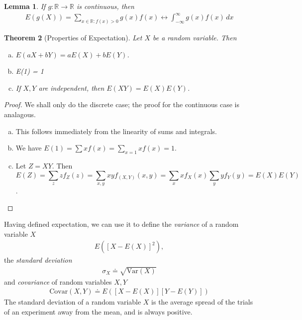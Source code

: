 \documentclass[12pt]{article}
\newcommand{\rr}{\mathbb{R}}
\newcommand{\var}{\text{Var}}
\newcommand{\covar}{\text{Covar}}
\theoremstyle{plain}
\newtheorem{theorem}{Theorem}
\newtheorem{lemma}[theorem]{Lemma}
\theoremstyle{definition}
\theoremstyle{remark}
\numberwithin{equation}{section}  %
\begin{document}
\begin{lemma}
If $g: \rr \to \rr$ is continuous, then
\begin{align*}
E(g(X)) = \sum_{x \in \rr: f(x) > 0} g(x) f(x) \longleftrightarrow
\int_{-\infty}^{\infty} g(x) f(x) \, dx
\end{align*}
\end{lemma}
\begin{theorem}[Properties of Expectation]
Let $X$ be a random variable. Then
\begin{enumerate}[a)]
	\item $E(aX + bY) = aE(X) + bE(Y)$.
	\item E(1) = 1
	\item If $X,Y$ are independent, then $E(XY) = E(X)E(Y)$.
\end{enumerate}
\end{theorem}
\begin{proof}
We shall only do the discrete case; the proof for the continuous case is
analagous.
\begin{enumerate}[a)]
\item This follows immediately from the linearity of sums and integrals.
\item
We have $E(1) = \sum x f(x) = \sum_{x = 1} x f(x) = 1.$
\item
Let $Z = XY$. Then
\[E(Z) = \sum_{z} z f_Z(z) = \sum_{x,y} xy f_{(X,Y)}(x,y) = \sum_x x f_X(x)
\sum_y y f_Y(y) = E(X) E(Y)\].
\end{enumerate}
\end{proof}
Having defined expectation, we can use it to define the
\emph{variance} of a random variable $X$
\begin{align*}
E([X - E(X)]^2),
\end{align*}
the \emph{standard deviation}
\begin{align*}
\sigma_X \doteq \sqrt{\var(X)}
\end{align*}
and \emph{covariance} of random variables $X, Y$
\begin{align*}
\covar(X,Y) \doteq E([X - E(X)][Y - E(Y)])
\end{align*}
The standard deviation of a random variable $X$ is the average spread of the
trials of an experiment away from the mean, and is always positive. 
\end{document}
